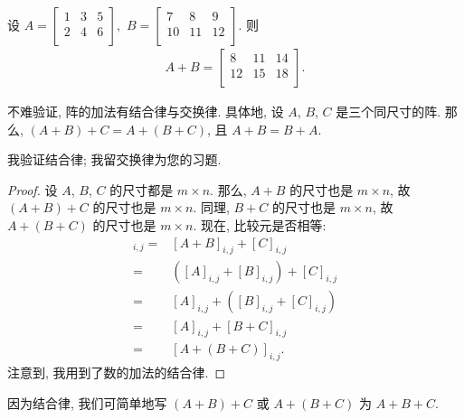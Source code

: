 \begin{example}
    设
    \(
    A = \begin{bmatrix}
        1 & 3 & 5 \\
        2 & 4 & 6 \\
    \end{bmatrix},
    \)
    \(
    B = \begin{bmatrix}
        7  & 8  & 9  \\
        10 & 11 & 12 \\
    \end{bmatrix}.
    \)
    则
    \begin{align*}
        A + B =
        \begin{bmatrix}
            8  & 11 & 14 \\
            12 & 15 & 18 \\
        \end{bmatrix}.
    \end{align*}
\end{example}

不难验证, 阵的加法有结合律与交换律.
具体地, 设 \(A\), \(B\), \(C\) 是三个同尺寸的阵.
那么,
\((A + B) + C = A + (B + C)\),
且
\(A + B = B + A\).

我验证结合律;
我留交换律为您的习题.

\begin{proof}
    设 \(A\), \(B\), \(C\) 的尺寸都是 \(m \times n\).
    那么, \(A + B\) 的尺寸也是 \(m \times n\),
    故 \((A + B) + C\) 的尺寸也是 \(m \times n\).
    同理, \(B + C\) 的尺寸也是 \(m \times n\),
    故 \(A + (B + C)\) 的尺寸也是 \(m \times n\).
    现在, 比较元是否相等:
    \begin{align*}
        [(A + B) + C]_{i,j}
        = {} & [A + B]_{i,j} + [C]_{i,j}           \\
        = {} & ([A]_{i,j} + [B]_{i,j}) + [C]_{i,j} \\
        = {} & [A]_{i,j} + ([B]_{i,j} + [C]_{i,j}) \\
        = {} & [A]_{i,j} + [B + C]_{i,j}           \\
        = {} & [A + (B + C)]_{i,j}.
    \end{align*}
    注意到, 我用到了数的加法的结合律.
\end{proof}

因为结合律, 我们可简单地写
\((A + B) + C\) 或 \(A + (B + C)\)
为 \(A + B + C\).

\vspace{2ex}

